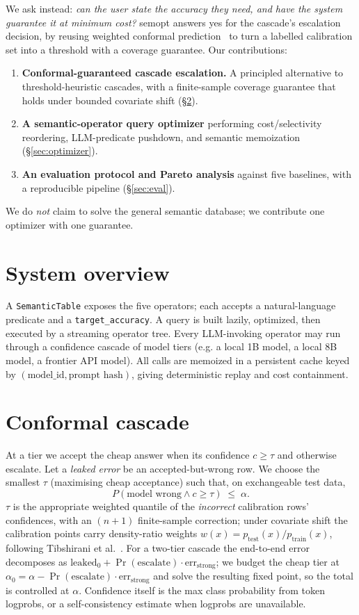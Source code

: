 \documentclass[10pt,twocolumn]{article}
\begin{document}
We ask instead: \emph{can the user state the accuracy they need, and have the system
guarantee it at minimum cost?} semopt answers yes for the cascade's escalation decision, by
reusing weighted conformal prediction~\cite{tibshirani} to turn a labelled calibration set
into a threshold with a coverage guarantee. Our contributions:
\begin{enumerate}
  \item \textbf{Conformal-guaranteed cascade escalation.} A principled alternative to
  threshold-heuristic cascades, with a finite-sample coverage guarantee that holds under
  bounded covariate shift (\S\ref{sec:conformal}).
  \item \textbf{A semantic-operator query optimizer} performing cost/selectivity
  reordering, LLM-predicate pushdown, and semantic memoization (\S\ref{sec:optimizer}).
  \item \textbf{An evaluation protocol and Pareto analysis} against five baselines, with a
  reproducible pipeline (\S\ref{sec:eval}).
\end{enumerate}
We do \emph{not} claim to solve the general semantic database; we contribute one optimizer
with one guarantee.

\section{System overview}
A \texttt{SemanticTable} exposes the five operators; each accepts a natural-language
predicate and a \texttt{target\_accuracy}. A query is built lazily, optimized, then
executed by a streaming operator tree. Every LLM-invoking operator may run through a
confidence cascade of model tiers (e.g. a local 1B model, a local 8B model, a frontier API
model). All calls are memoized in a persistent cache keyed by $(\textrm{model\_id},
\textrm{prompt hash})$, giving deterministic replay and cost containment.

\section{Conformal cascade}\label{sec:conformal}
At a tier we accept the cheap answer when its confidence $c \ge \tau$ and otherwise
escalate. Let a \emph{leaked error} be an accepted-but-wrong row. We choose the smallest
$\tau$ (maximising cheap acceptance) such that, on exchangeable test data,
\[
  P(\text{model wrong} \wedge c \ge \tau) \;\le\; \alpha .
\]
$\tau$ is the appropriate weighted quantile of the \emph{incorrect} calibration rows'
confidences, with an $(n{+}1)$ finite-sample correction; under covariate shift the
calibration points carry density-ratio weights $w(x)=p_{\text{test}}(x)/p_{\text{train}}(x)$,
following Tibshirani et al.~\cite{tibshirani}. For a two-tier cascade the end-to-end error
decomposes as
$\text{leaked}_0 + \Pr(\text{escalate}) \cdot \text{err}_{\text{strong}}$;
we budget the cheap tier at $\alpha_0 = \alpha - \Pr(\text{escalate})\cdot
\text{err}_{\text{strong}}$ and solve the resulting fixed point, so the total is controlled
at $\alpha$. Confidence itself is the max class probability from token logprobs, or a
self-consistency estimate when logprobs are unavailable.
\end{document}
